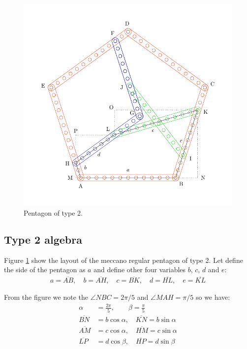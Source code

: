 \documentclass[11pt]{article}
\begin{document}
\begin{figure}[H] %
\centering
\includegraphics[scale=0.75]{types/2}
\caption{Pentagon of type 2.}
\label{fig:type-2}
\end{figure}

\subsection{Type 2 algebra}

Figure \ref{fig:type-2} show the layout of the meccano regular pentagon of type 2.
Let define the side of the pentagon as $a$ and define other four variables $b$, $c$, $d$ and $e$:
\begin{align*}
a = \overline{AB},\quad
b = \overline{AH},\quad
c = \overline{BK},\quad
d = \overline{HL},\quad
e = \overline{KL}
\end{align*}


From the figure we note the $\angle{NBC} = 2\pi/5$ and $\angle{MAH} = \pi/5$ so we have:
\begin{align}
\alpha &= \frac{2\pi}{5}, \qquad\beta = \frac{\pi}{5}\\
\overline{BN} &= b\cos{\alpha}, \quad \overline{KN} = b\sin{\alpha}\\
\overline{AM} &= c\cos{\alpha}, \quad \overline{HM} = c\sin{\alpha}\\
\overline{LP} &= d\cos{\beta}, \quad \overline{HP} = d\sin{\beta}
\end{align}
\end{document}
